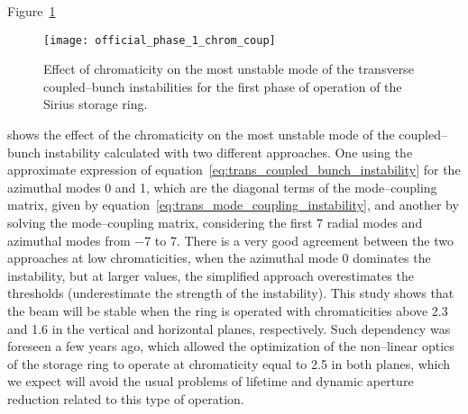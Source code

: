     Figure~\ref{fig:ph1_chrom_coup}
    \begin{figure}
        \centering
        \texttt{[image: official\_phase\_1\_chrom\_coup]}
        \caption{Effect of chromaticity on the most unstable mode of the transverse coupled--bunch instabilities for the first phase of operation of the Sirius storage ring.}
        \label{fig:ph1_chrom_coup}
    \end{figure}
    shows the effect of the chromaticity on the most unstable mode of the coupled--bunch instability calculated with two different approaches. One using the approximate expression of equation~\ref{eq:trans_coupled_bunch_instability} for the azimuthal modes \num{0} and \num{1}, which are the diagonal terms of the mode--coupling matrix, given by equation~\ref{eq:trans_mode_coupling_instability}, and another by solving the mode--coupling matrix, considering the first \num{7} radial modes and azimuthal modes from \num{-7} to \num{7}.
    There is a very good agreement between the two approaches at low chromaticities, when the azimuthal mode \num{0} dominates the instability, but at larger values, the simplified approach overestimates the thresholds (underestimate the strength of the instability).
    This study shows that the beam will be stable when the ring is operated with chromaticities above \num{2.3} and \num{1.6} in the vertical and horizontal planes, respectively. Such dependency was foreseen a few years ago, which allowed the optimization of the non--linear optics of the storage ring to operate at chromaticity equal to \num{2.5} in both planes, which we expect will avoid the usual problems of lifetime and dynamic aperture reduction related to this type of operation.

